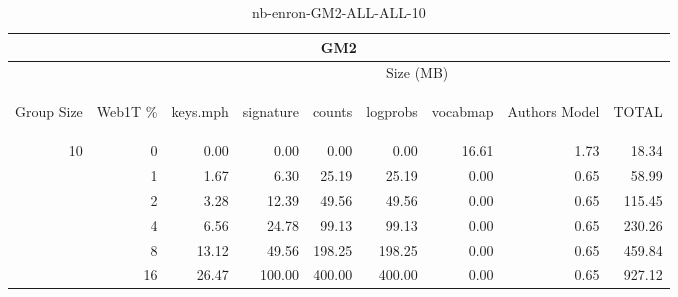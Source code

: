 \begin{center}
\begin{table}[htbp]
\begin{tabular}{ | r | r | r | r | r | r | r | r | r |}
\hline
\multicolumn{9}{|c|}{GM2}\\
\hline
 & & \multicolumn{7}{|c|}{Size (MB)}\\ \cline{3-9}
\begin{sideways}Group Size\end{sideways} & \begin{sideways}Web1T \% \end{sideways} & \begin{sideways}keys.mph\end{sideways} & \begin{sideways}signature\end{sideways} & \begin{sideways}counts\end{sideways} & \begin{sideways}logprobs\end{sideways} & \begin{sideways}vocabmap\end{sideways} & \begin{sideways}Authors Model \end{sideways} & \begin{sideways}TOTAL\end{sideways}\\
\hline
\multirow{5}{*}{10}
 & 0 & 0.00 & 0.00 & 0.00 & 0.00 & 16.61 & 1.73 & 18.34\\ \cline{2-9}
 & 1 & 1.67 & 6.30 & 25.19 & 25.19 & 0.00 & 0.65 & 58.99\\ \cline{2-9}
 & 2 & 3.28 & 12.39 & 49.56 & 49.56 & 0.00 & 0.65 & 115.45\\ \cline{2-9}
 & 4 & 6.56 & 24.78 & 99.13 & 99.13 & 0.00 & 0.65 & 230.26\\ \cline{2-9}
 & 8 & 13.12 & 49.56 & 198.25 & 198.25 & 0.00 & 0.65 & 459.84\\ \cline{2-9}
 & 16 & 26.47 & 100.00 & 400.00 & 400.00 & 0.00 & 0.65 & 927.12\\ \cline{2-9}
\hline
\end{tabular}
\caption{nb-enron-GM2-ALL-ALL-10}
\label{table:nb-enron-GM2-ALL-ALL-10}
\end{table}
\end{center}

